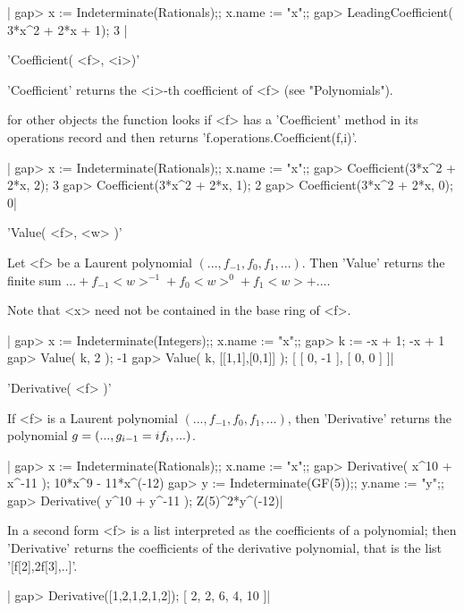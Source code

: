|    gap> x := Indeterminate(Rationals);; x.name := "x";;
    gap> LeadingCoefficient( 3*x^2 + 2*x + 1);
    3 |


'Coefficient( <f>, <i>)'

'Coefficient' returns the <i>-th coefficient of <f> (see "Polynomials").

for  other objects the function looks if  <f> has a 'Coefficient' method in
its operations record and then returns 'f.operations.Coefficient(f,i)'.

|    gap> x := Indeterminate(Rationals);; x.name := "x";;
    gap> Coefficient(3*x^2 + 2*x, 2);
    3
    gap> Coefficient(3*x^2 + 2*x, 1);
    2
    gap> Coefficient(3*x^2 + 2*x, 0);
    0|


'Value( <f>, <w> )'

Let <f> be  a Laurent  polynomial $(..., f_{-1}, f_0,  f_1,  ...)$.  Then
'Value' returns the finite sum $... +  f_{-1} <w>^{-1} + f_0 <w>^0 +  f_1
<w> + ...$.

Note that <x> need not be contained in the base ring of <f>.

|    gap> x := Indeterminate(Integers);; x.name := "x";;
    gap> k := -x + 1;
    -x + 1
    gap> Value( k, 2 );
    -1
    gap> Value( k, [[1,1],[0,1]] );
    [ [ 0, -1 ], [ 0, 0 ] ]|



'Derivative( <f> )'

If <f> is a Laurent  polynomial $(..., f_{-1},  f_0,  f_1,  ...)$, then
'Derivative' returns the polynomial $g = (..., g_{i-1} = i\* f_i, ... )$.

|    gap> x := Indeterminate(Rationals);; x.name := "x";;
    gap> Derivative( x^10 + x^-11 );
    10*x^9 - 11*x^(-12)
    gap> y := Indeterminate(GF(5));; y.name := "y";;    
    gap> Derivative( y^10 + y^-11 );
    Z(5)^2*y^(-12)|

In a second form <f> is a list interpreted as the coefficients of a
polynomial; then 'Derivative' returns the coefficients of the derivative
polynomial, that is the list '[f[2],2\*f[3],..]'.

|    gap> Derivative([1,2,1,2,1,2]);
    [ 2, 2, 6, 4, 10 ]|

